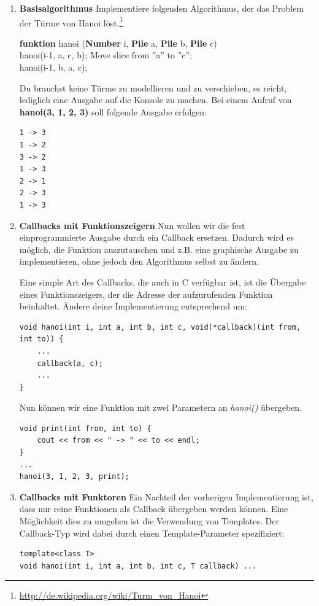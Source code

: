 \begin{enumerate}

\item \textbf{Basisalgorithmus}
Implementiere folgenden Algorithmus, der das Problem der Türme von Hanoi löst.\footnote{\url{http://de.wikipedia.org/wiki/Turm_von_Hanoi}} \\
\begin{algorithm}[H]
 \SetAlgoLined
 \textbf{funktion} hanoi (\textbf{Number} i, \textbf{Pile} a, \textbf{Pile} b, \textbf{Pile} c) { \\
      {
        hanoi(i-1, a, c, b); 
        Move slice from ''a'' to ''c''; \\
        hanoi(i-1, b, a, c); 
     }
 }
\end{algorithm}

Du brauchst keine Türme zu modellieren und zu verschieben, es reicht, lediglich eine Ausgabe auf die Konsole zu machen. Bei einem Aufruf von \textbf{hanoi(3, 1, 2, 3)} soll folgende Ausgabe erfolgen:
\begin{lstlisting}
1 -> 3
1 -> 2
3 -> 2
1 -> 3
2 -> 1
2 -> 3
1 -> 3
\end{lstlisting}

\item \textbf{Callbacks mit Funktionszeigern}
Nun wollen wir die fest einprogrammierte Ausgabe durch ein Callback ersetzen. Dadurch wird es möglich, die Funktion auszutauschen und z.B. eine graphische Ausgabe zu implementieren, ohne jedoch den Algorithmus selbst zu ändern.

Eine simple Art des Callbacks, die auch in C verfügbar ist, ist die Übergabe eines Funktionszeigers, der die Adresse der aufzurufenden Funktion beinhaltet.
Ändere deine Implementierung entsprechend um:

\begin{lstlisting}
void hanoi(int i, int a, int b, int c, void(*callback)(int from, int to)) {
	...
	callback(a, c);
	...
}
\end{lstlisting}

Nun können wir eine Funktion mit zwei Parametern an \emph{hanoi()} übergeben.
\begin{lstlisting}
void print(int from, int to) {
	cout << from << " -> " << to << endl;
}
...
hanoi(3, 1, 2, 3, print);
\end{lstlisting}

\item \textbf{Callbacks mit Funktoren}
Ein Nachteil der vorherigen Implementierung ist, dass nur reine Funktionen als Callback übergeben werden können.
Eine Möglichkeit dies zu umgehen ist die Verwendung von Templates.
Der Callback-Typ wird dabei durch einen Template-Parameter spezifiziert:
\begin{lstlisting}
template<class T>
void hanoi(int i, int a, int b, int c, T callback) ...
\end{lstlisting}


\end{enumerate}
